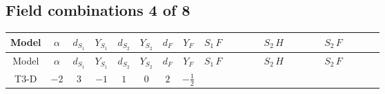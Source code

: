 \documentclass[8pt]{article}
\begin{document}
\begin{landscape}
\subsection*{Field combinations 4 of 8}
\begin{longtable}{@{}cccccccc >{\raggedright\arraybackslash}p{0.21\linewidth} >{\raggedright\arraybackslash}p{0.21\linewidth} >{\raggedright\arraybackslash}p{0.21\linewidth}@{}}
\toprule
Model & $\alpha$ & $d_{S_1}$ & $Y_{S_1}$ & $d_{S_2}$ & $Y_{S_2}$ & $d_F$ & $Y_F$ & $S_1\,F$ & $S_2\,H$ & $S_2\,F$ \\
\midrule
\endfirsthead
\toprule
Model & $\alpha$ & $d_{S_1}$ & $Y_{S_1}$ & $d_{S_2}$ & $Y_{S_2}$ & $d_F$ & $Y_F$ & $S_1\,F$ & $S_2\,H$ & $S_2\,F$ \\
\midrule
\endhead
T3-D & $-2$ & $3$ & $-1$ & $1$ & $0$ & $2$ & $-\frac{1}{2}$ & \scriptsize\adjustbox{max width=\linewidth}{$\begin{gathered} +\frac{2}{3} \hbar  \log \left(\frac{\bar{\mu}^{2}}{M_F^2}\right) \overline{y_{1,i_1,r_1}} \overline{y_{1,i_2,r_2}} S_{1,j_2}^2 y_{1,i_1,r_2} y_{1,i_2,r_1} \left(S_{1,j_1}{}^{\dagger }\right){}^2 \\ +\frac{2 C_{S_1^\dagger S_1} \hbar  \log \left(\frac{\bar{\mu}^{2}}{M_F^2}\right) \overline{y_{1,i_1,r_1}} S_{1,j_1} y_{1,i_1,r_1} S_{1,j_1}{}^{\dagger }}{\sqrt{3}} \\ -\frac{4}{3} \hbar  \log \left(\frac{\bar{\mu}^{2}}{M_F^2}\right) \overline{y_{1,i_1,r_1}} \overline{y_{1,i_2,r_2}} S_{1,j_1} S_{1,j_2} y_{1,i_1,r_2} y_{1,i_2,r_1} S_{1,j_1}{}^{\dagger } S_{1,j_2}{}^{\dagger }\end{gathered}$} & \scriptsize\adjustbox{max width=\linewidth}{$\begin{gathered} -\frac{2 \hbar  \overline{y_{2,i_1,r_1}} \overline{Y_{e,i_2,i_3}} H_{a_1} S_2 y_{2,i_2,r_1} Y_{e,i_1,i_3} H_{a_1}{}^{\dagger } S_2{}^{\dagger }}{\epsilon } \\ -2 \hbar  \overline{y_{2,i_1,r_1}} \overline{Y_{e,i_2,i_3}} H_{a_1} S_2 y_{2,i_2,r_1} Y_{e,i_1,i_3} H_{a_1}{}^{\dagger } S_2{}^{\dagger } \\ +H_{a_2} S_2 H_{a_1}{}^{\dagger } S_2{}^{\dagger } \mathcal{I}_{H2,a_1,a_2}{}^1 \lambda_{HS_2}^{(1)}^{(1)}\end{gathered}$} & \scriptsize\adjustbox{max width=\linewidth}{$\begin{gathered} -2 \hbar  \log \left(\frac{\bar{\mu}^{2}}{M_F^2}\right) \overline{y_{2,i_1,r_1}} \overline{y_{2,i_2,r_2}} S_2^2 y_{2,i_1,r_2} y_{2,i_2,r_1} \left(S_2{}^{\dagger }\right){}^2 \\ +2 C_{S_2^\dagger S_2} \hbar  \log \left(\frac{\bar{\mu}^{2}}{M_F^2}\right) \overline{y_{2,i_1,r_1}} S_2 y_{2,i_1,r_1} S_2{}^{\dagger } \\ -2 \hbar  \log \left(\frac{\bar{\mu}^{2}}{M_F^2}\right) \overline{y_{2,i_1,r_1}} S_2^2 y_{2,i_1,r_1} \left(S_2{}^{\dagger }\right){}^2 \lambda_{S_2}^{(1)}^{(1)}\end{gathered}$} \\

\end{longtable}
\end{landscape}
\end{document}
